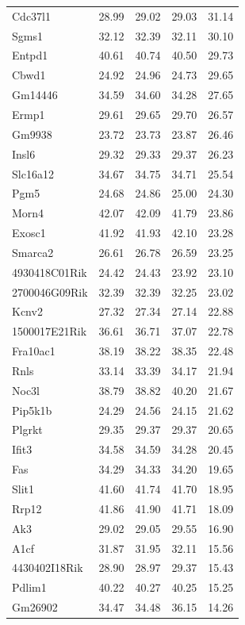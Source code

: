 \documentclass[oneside]{book}\usepackage[]{graphicx}\usepackage[]{color}
\begin{document}
\begin{appendices}
{\begin{longtable}{lrrrr}
  Cdc37l1 & 28.99 & 29.02 & 29.03 & 31.14 \\
  Sgms1 & 32.12 & 32.39 & 32.11 & 30.10 \\
  Entpd1 & 40.61 & 40.74 & 40.50 & 29.73 \\
  Cbwd1 & 24.92 & 24.96 & 24.73 & 29.65 \\
  Gm14446 & 34.59 & 34.60 & 34.28 & 27.65 \\
  Ermp1 & 29.61 & 29.65 & 29.70 & 26.57 \\
  Gm9938 & 23.72 & 23.73 & 23.87 & 26.46 \\
  Insl6 & 29.32 & 29.33 & 29.37 & 26.23 \\
  Slc16a12 & 34.67 & 34.75 & 34.71 & 25.54 \\
  Pgm5 & 24.68 & 24.86 & 25.00 & 24.30 \\
  Morn4 & 42.07 & 42.09 & 41.79 & 23.86 \\
  Exosc1 & 41.92 & 41.93 & 42.10 & 23.28 \\
  Smarca2 & 26.61 & 26.78 & 26.59 & 23.25 \\
  4930418C01Rik & 24.42 & 24.43 & 23.92 & 23.10 \\
  2700046G09Rik & 32.39 & 32.39 & 32.25 & 23.02 \\
  Kcnv2 & 27.32 & 27.34 & 27.14 & 22.88 \\
  1500017E21Rik & 36.61 & 36.71 & 37.07 & 22.78 \\
  Fra10ac1 & 38.19 & 38.22 & 38.35 & 22.48 \\
  Rnls & 33.14 & 33.39 & 34.17 & 21.94 \\
  Noc3l & 38.79 & 38.82 & 40.20 & 21.67 \\
  Pip5k1b & 24.29 & 24.56 & 24.15 & 21.62 \\
  Plgrkt & 29.35 & 29.37 & 29.37 & 20.65 \\
  Ifit3 & 34.58 & 34.59 & 34.28 & 20.45 \\
  Fas & 34.29 & 34.33 & 34.20 & 19.65 \\
  Slit1 & 41.60 & 41.74 & 41.70 & 18.95 \\
  Rrp12 & 41.86 & 41.90 & 41.71 & 18.09 \\
  Ak3 & 29.02 & 29.05 & 29.55 & 16.90 \\
  A1cf & 31.87 & 31.95 & 32.11 & 15.56 \\
  4430402I18Rik & 28.90 & 28.97 & 29.37 & 15.43 \\
  Pdlim1 & 40.22 & 40.27 & 40.25 & 15.25 \\
  Gm26902 & 34.47 & 34.48 & 36.15 & 14.26 \\

\end{longtable}}
\end{appendices}
\end{document}
